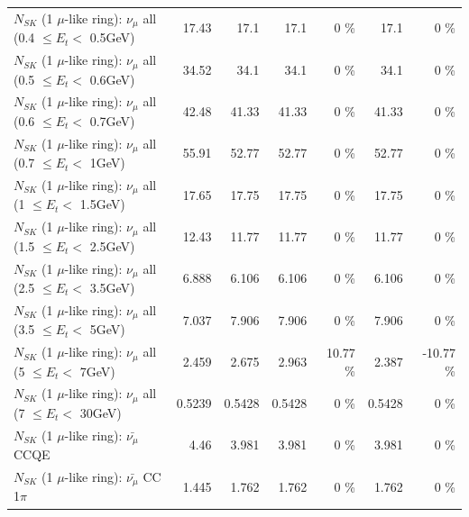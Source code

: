 \begin{table}
\begin{tabular}{| l | r | r | r  r | r  r |}
       $N_{SK}$ (1 $\mu$-like ring): $\nu_{\mu}$ all (0.4 $\leq E_{t} <$ 0.5GeV) &           17.43 &            17.1 &            17.1 &        0 \%  &            17.1 &        0 \%  \\ 
       $N_{SK}$ (1 $\mu$-like ring): $\nu_{\mu}$ all (0.5 $\leq E_{t} <$ 0.6GeV) &           34.52 &            34.1 &            34.1 &        0 \%  &            34.1 &        0 \%  \\ 
       $N_{SK}$ (1 $\mu$-like ring): $\nu_{\mu}$ all (0.6 $\leq E_{t} <$ 0.7GeV) &           42.48 &           41.33 &           41.33 &        0 \%  &           41.33 &        0 \%  \\ 
         $N_{SK}$ (1 $\mu$-like ring): $\nu_{\mu}$ all (0.7 $\leq E_{t} <$ 1GeV) &           55.91 &           52.77 &           52.77 &        0 \%  &           52.77 &        0 \%  \\ 
         $N_{SK}$ (1 $\mu$-like ring): $\nu_{\mu}$ all (1 $\leq E_{t} <$ 1.5GeV) &           17.65 &           17.75 &           17.75 &        0 \%  &           17.75 &        0 \%  \\ 
       $N_{SK}$ (1 $\mu$-like ring): $\nu_{\mu}$ all (1.5 $\leq E_{t} <$ 2.5GeV) &           12.43 &           11.77 &           11.77 &        0 \%  &           11.77 &        0 \%  \\ 
       $N_{SK}$ (1 $\mu$-like ring): $\nu_{\mu}$ all (2.5 $\leq E_{t} <$ 3.5GeV) &           6.888 &           6.106 &           6.106 &        0 \%  &           6.106 &        0 \%  \\ 
         $N_{SK}$ (1 $\mu$-like ring): $\nu_{\mu}$ all (3.5 $\leq E_{t} <$ 5GeV) &           7.037 &           7.906 &           7.906 &        0 \%  &           7.906 &        0 \%  \\ 
           $N_{SK}$ (1 $\mu$-like ring): $\nu_{\mu}$ all (5 $\leq E_{t} <$ 7GeV) &           2.459 &           2.675 &           2.963 &    10.77 \%  &           2.387 &   -10.77 \%  \\ 
          $N_{SK}$ (1 $\mu$-like ring): $\nu_{\mu}$ all (7 $\leq E_{t} <$ 30GeV) &          0.5239 &          0.5428 &          0.5428 &        0 \%  &          0.5428 &        0 \%  \\ 
\hline
\hline
\hline
                              $N_{SK}$ (1 $\mu$-like ring): $\bar{\nu_\mu}$ CCQE &            4.46 &           3.981 &           3.981 &        0 \%  &           3.981 &        0 \%  \\ 
                         $N_{SK}$ (1 $\mu$-like ring): $\bar{\nu_\mu}$ CC 1$\pi$ &           1.445 &           1.762 &           1.762 &        0 \%  &           1.762 &        0 \%  \\ 

\end{tabular}
\end{table}
